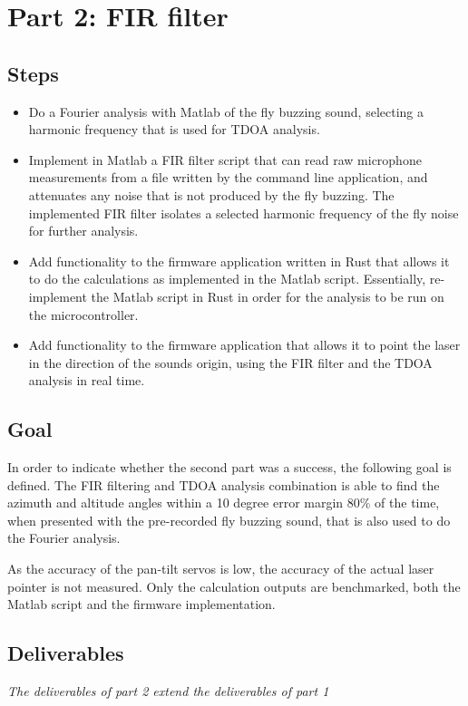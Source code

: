 \documentclass[a4paper]{article}
\begin{document}
\section{Part 2: FIR filter}
\subsection{Steps}
\begin{itemize}
    \item Do a Fourier analysis with Matlab of the fly buzzing sound, selecting a harmonic frequency that is used for TDOA analysis.
    \item Implement in Matlab a FIR filter script that can read raw microphone measurements from a file written by the command line application, and attenuates any noise that is not produced by the fly buzzing. The implemented FIR filter isolates a selected harmonic frequency of the fly noise for further analysis.
    \item Add functionality to the firmware application written in Rust that allows it to do the calculations as implemented in the Matlab script. Essentially, re-implement the Matlab script in Rust in order for the analysis to be run on the microcontroller.
    \item Add functionality to the firmware application that allows it to point the laser in the direction of the sounds origin, using the FIR filter and the TDOA analysis in real time.
\end{itemize}

\subsection{Goal}
In order to indicate whether the second part was a success, the following goal is defined. The FIR filtering and TDOA analysis combination is able to find the azimuth and altitude angles within a 10 degree error margin 80\% of the time, when presented with the pre-recorded fly buzzing sound, that is also used to do the Fourier analysis. 

As the accuracy of the pan-tilt servos is low, the accuracy of the actual laser pointer is not measured. Only the calculation outputs are benchmarked, both the Matlab script and the firmware implementation.

\subsection{Deliverables}
\textit{The deliverables of part 2 extend the deliverables of part 1}
\end{document}
